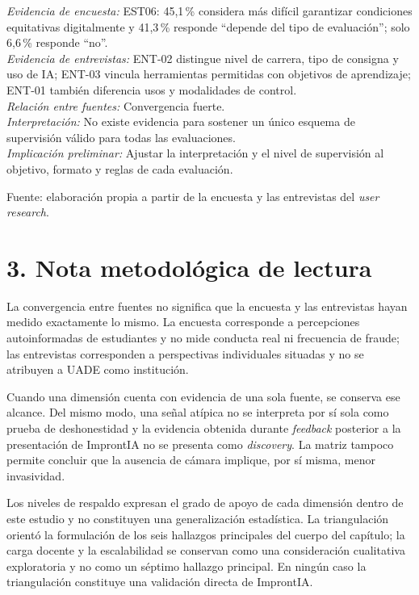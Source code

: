 \begin{center}
\begin{infobox}
\textit{Evidencia de encuesta:} EST06: 45,1\,\% considera más difícil garantizar condiciones equitativas digitalmente y 41,3\,\% responde ``depende del tipo de evaluación''; solo 6,6\,\% responde ``no''.\\
\textit{Evidencia de entrevistas:} ENT-02 distingue nivel de carrera, tipo de consigna y uso de IA; ENT-03 vincula herramientas permitidas con objetivos de aprendizaje; ENT-01 también diferencia usos y modalidades de control.\\
\textit{Relación entre fuentes:} Convergencia fuerte.\\
\textit{Interpretación:} No existe evidencia para sostener un único esquema de supervisión válido para todas las evaluaciones.\\
\textit{Implicación preliminar:} Ajustar la interpretación y el nivel de supervisión al objetivo, formato y reglas de cada evaluación.
\end{infobox}
\vspace{2pt}
\end{center}
Fuente: elaboración propia a partir de la encuesta y las entrevistas del \textit{user research}.

\section*{3. Nota metodológica de lectura}
La convergencia entre fuentes no significa que la encuesta y las entrevistas hayan medido exactamente lo mismo. La encuesta corresponde a percepciones autoinformadas de estudiantes y no mide conducta real ni frecuencia de fraude; las entrevistas corresponden a perspectivas individuales situadas y no se atribuyen a UADE como institución.

Cuando una dimensión cuenta con evidencia de una sola fuente, se conserva ese alcance. Del mismo modo, una señal atípica no se interpreta por sí sola como prueba de deshonestidad y la evidencia obtenida durante \textit{feedback} posterior a la presentación de ImprontIA no se presenta como \textit{discovery}. La matriz tampoco permite concluir que la ausencia de cámara implique, por sí misma, menor invasividad.

Los niveles de respaldo expresan el grado de apoyo de cada dimensión dentro de este estudio y no constituyen una generalización estadística. La triangulación orientó la formulación de los seis hallazgos principales del cuerpo del capítulo; la carga docente y la escalabilidad se conservan como una consideración cualitativa exploratoria y no como un séptimo hallazgo principal. En ningún caso la triangulación constituye una validación directa de ImprontIA.
